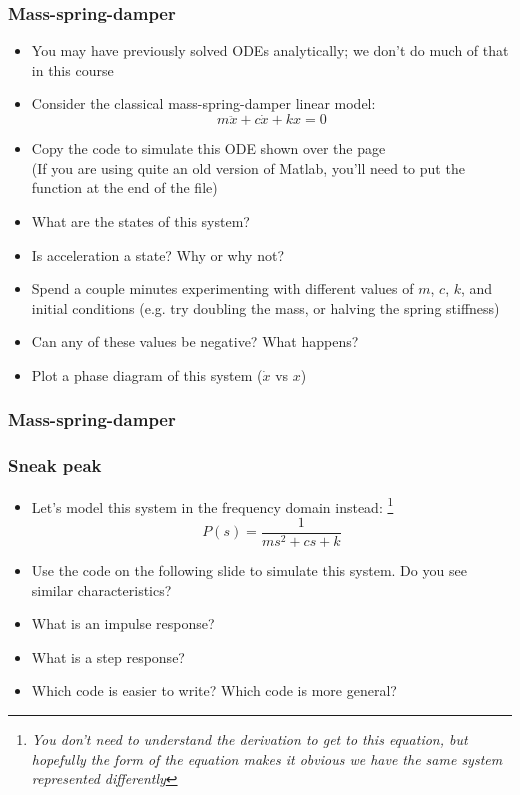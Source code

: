 \documentclass[9pt]{beamer-control}
\begin{document}
\begin{frame}
  \frametitle{Mass-spring-damper}
  \begin{itemize}
    \item You may have previously solved ODEs analytically; we don't do much of that in this course
    \item Consider the classical mass-spring-damper linear model:
      \begin{equation}
        m\ddot x + c\dot x + k x = 0
      \end{equation}
    \item Copy the code to simulate this ODE shown over the page\\
      (If you are using quite an old version of Matlab, you'll need to put the function at the end of the file)
    \item What are the states of this system?
    \item Is acceleration a state? Why or why not?
    \item Spend a couple minutes experimenting with different values of $m$, $c$, $k$, and initial conditions (e.g. try doubling the mass, or halving the spring stiffness)
    \item Can any of these values be negative? What happens?
    \item Plot a phase diagram of this system ($\dot x$ vs $x$)
  \end{itemize}
\end{frame}

\begin{frame}
  \frametitle{Mass-spring-damper}
\end{frame}

\begin{frame}
  \frametitle{Sneak peak}
  \begin{itemize}
    \item Let's model this system in the frequency domain instead:%
      \footnote{\emph{You don't need to understand the derivation to get to this equation, but hopefully the form of the equation makes it obvious we have the same system represented differently}}
      \begin{equation}
        P(s) = \frac{1}{ms^2+cs+k}
      \end{equation}
    \item Use the code on the following slide to simulate this system. Do you see similar characteristics?
    \item What is an impulse response?
    \item What is a step response?
    \item Which code is easier to write? Which code is more general?
  \end{itemize}
\end{frame}
\end{document}
